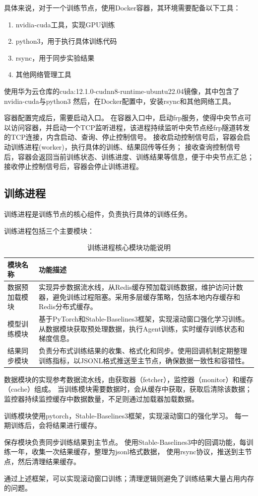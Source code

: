 具体来说，对于一个训练节点，使用Docker容器，其环境需要配备以下工具：
\begin{enumerate}
    \item nvidia-cuda工具，实现GPU训练
    \item python3，用于执行具体训练代码  
    \item rsync，用于同步实验结果
    \item 其他网络管理工具
\end{enumerate}

使用华为云仓库的cuda:12.1.0-cudnn8-runtime-ubuntu22.04镜像，其中包含了nvidia-cuda与python3  
然后，在Docker配置中，安装rsync和其他网络工具。

容器配置完成后，需要启动入口。
在容器入口中，启动frp服务，使得中央节点可以访问容器，并启动一个TCP监听进程，该进程持续监听中央节点经frp隧道转发的TCP连接，内含启动、查询、停止控制信号。  
接收启动控制信号后，容器会启动训练进程(worker)，执行具体的训练、结果回传等任务；
接收查询控制信号后，容器会返回当前训练状态、训练进度、训练结果等信息，便于中央节点汇总；
接收停止控制信号后，容器会停止训练进程。  

\subsection{训练进程}
训练进程是训练节点的核心组件，负责执行具体的训练任务。

训练进程包括三个主要模块：

\begin{table}[H]
    \centering
    \caption{训练进程核心模块功能说明}
    \label{tab:worker-modules-detail}
    \begin{tabular}{@{}>{\raggedright}p{}>{\raggedright\arraybackslash}p{}@{}}
    \toprule
    \textbf{模块名称} & \textbf{功能描述} \\
    \midrule
    数据预加载模块 & 实现异步数据流水线，从Redis缓存预加载训练数据，维护访问计数器，避免训练过程阻塞。采用多层缓存策略，包括本地内存缓存和Redis分布式缓存。 \\
    \midrule
    模型训练模块 & 基于PyTorch和Stable-Baselines3框架，实现滚动窗口强化学习训练。从数据模块获取预处理数据，执行Agent训练，实时缓存训练状态和梯度信息。 \\
    \midrule
    结果同步模块 & 负责分布式训练结果的收集、格式化和同步。使用回调机制定期整理训练指标，以JSONL格式推送至主节点，确保数据一致性和容错性。 \\
    \bottomrule
    \end{tabular}
\end{table}

数据模块的实现参考数据流水线，由获取器（fetcher），监控器（monitor）和缓存（cache）组成。
当训练模块需要数据时，会从缓存中获取，获取后清除该数据；
监控器持续监控缓存中数据数量，不足则通过加载器加载数据。

训练模块使用pytorch，Stable-Baselines3框架，实现滚动窗口的强化学习。
每一期训练后，会将结果进行缓存。

保存模块负责同步训练结果到主节点。
使用Stable-Baselines3中的回调功能，每训练一年，收集一次结果缓存，整理为jsonl格式数据，
使用rsync协议，推送到主节点，然后清理结果缓存。

通过上述框架，可以实现滚动窗口训练；清理逻辑则避免了训练结果大量占用内存的问题。
